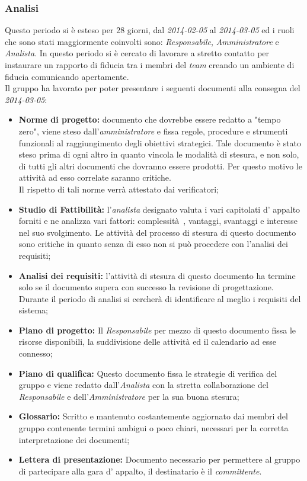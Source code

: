 \subsubsection{Analisi}
Questo periodo si è esteso per 28 giorni, dal \textit{2014-02-05} al \textit{2014-03-05} ed i ruoli che sono stati maggiormente coinvolti sono: \textit{Responsabile}, \textit{Amministratore} e \textit{Analista}.
In questo periodo si è cercato di lavorare a stretto contatto per instaurare un rapporto di fiducia tra i membri del \textit{team} creando un ambiente di fiducia comunicando apertamente.
\\
Il gruppo \gruppo ha lavorato per poter presentare i seguenti documenti alla consegna del \textit{2014-03-05}:
\begin{itemize}
	\item \textbf{Norme di progetto:} documento che dovrebbe essere redatto a "tempo zero", viene steso dall'\textit{amministratore} e fissa regole, procedure e strumenti funzionali al raggiungimento degli obiettivi strategici. Tale documento è stato steso prima di ogni altro in quanto vincola le modalità di stesura, e non solo, di tutti gli altri documenti che dovranno essere prodotti. Per questo motivo le attività ad esso correlate saranno critiche.
	\\ Il rispetto di tali norme verrà attestato dai verificatori;
	\item \textbf{Studio di Fattibilità:} l'\textit{analista} designato valuta i vari capitolati d' appalto forniti e ne analizza vari fattori: complessità~, vantaggi, svantaggi e interesse nel suo svolgimento. Le attività del processo di stesura di questo documento sono critiche in quanto senza di esso non si può procedere con l'analisi dei requisiti;
	\item \textbf{Analisi dei requisiti:} l'attività di stesura di questo documento ha termine solo se il documento supera con successo la revisione di progettazione. Durante il periodo di analisi si cercherà di identificare al meglio i requisiti del sistema;
	\item \textbf{Piano di progetto:} Il \textit{Responsabile} per mezzo di questo documento fissa le risorse disponibili, la suddivisione delle attività ed il calendario ad esse connesso; 
	\item \textbf{Piano di qualifica:} Questo documento fissa le strategie di verifica del gruppo e viene redatto dall'\textit{Analista} con la stretta collaborazione del \textit{Responsabile} e dell'\textit{Amministratore} per la sua buona stesura;
	\item \textbf{Glossario:} Scritto e mantenuto costantemente aggiornato dai membri del gruppo contenente termini ambigui o poco chiari, necessari per la corretta interpretazione dei documenti;
	\item \textbf{Lettera di presentazione:} Documento necessario per permettere al gruppo di partecipare alla gara d' appalto, il destinatario è il \textit{committente}.
\end{itemize}

